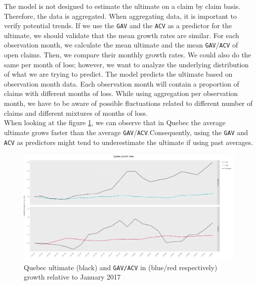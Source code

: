 	The model is not designed to estimate the ultimate on a claim by claim basis. Therefore, the data is aggregated. When aggregating data, it is important to verify potential trends. If we use the \texttt{GAV} and the \texttt{ACV} as a predictor for the ultimate, we should validate that the mean growth rates are similar. For each observation month, we calculate the mean ultimate and the mean \texttt{GAV}/\texttt{ACV} of open claims. Then, we compare their monthly growth rates.  We could also do the same per month of loss; however, we want to analyze the underlying distribution of what we are trying to predict. The model predicts the ultimate based on observation month data. Each observation month will contain a proportion of claims with different months of loss. While using aggregation per observation month, we have to be aware of possible fluctuations related to different number of claims and different mixtures of months of loss.\\
	When looking at the figure \ref{Fig_QC_growth}, we can observe that in Quebec the average ultimate grows faster than the average \texttt{GAV}/\texttt{ACV}.Consequently, using the \texttt{GAV} and \texttt{ACV} as predictors might tend to underestimate the ultimate if using past averages. 
	
	\begin{figure}[H]
		\begin{center}
			\includegraphics[scale=0.14]{Graphiques/QC_growth} 
			\renewcommand{\figurename}{Figure}
			\caption[Quebec ultimate and \texttt{GAV/ACV} growth]{Quebec ultimate (black) and \texttt{GAV/ACV} in (blue/red respectively) growth relative to January 2017}\label{Fig_QC_growth}
		\end{center}
	\end{figure}

